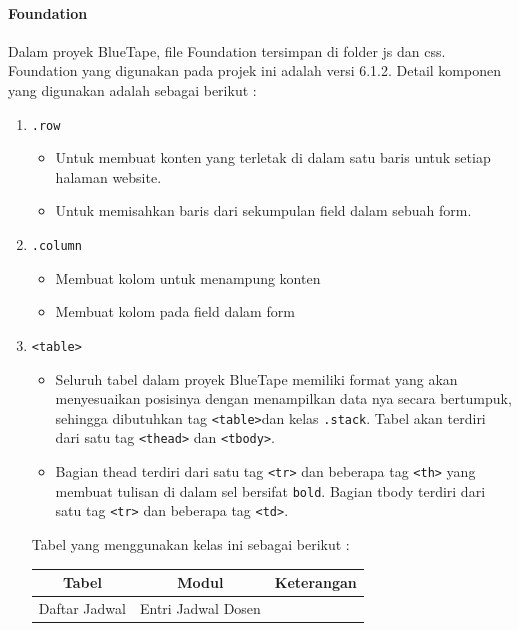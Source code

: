\documentclass[a4paper,twoside]{article}
\begin{document}
\begin{enumerate}
		\paragraph{Foundation}
		Dalam proyek BlueTape, file Foundation tersimpan di folder js dan css. Foundation yang digunakan pada projek ini adalah versi 6.1.2. Detail komponen yang digunakan adalah sebagai berikut :
		\begin{enumerate}
			\item \colorbox{mygray}{\texttt{.row}}
			\begin{itemize}
				\item Untuk membuat konten yang terletak di dalam satu baris untuk setiap halaman website.
				\item Untuk memisahkan baris dari sekumpulan field dalam sebuah form.
			\end{itemize}
			\item \colorbox{mygray}{\texttt{.column}}
			\begin{itemize}
				\item Membuat kolom untuk menampung konten
				\item Membuat kolom pada field dalam form
			\end{itemize}	
			\item \colorbox{mygray}{\texttt{<table>}}  \par
			\begin{itemize}
				\item 	Seluruh tabel dalam proyek BlueTape memiliki format yang akan menyesuaikan posisinya dengan menampilkan data nya secara bertumpuk, sehingga dibutuhkan tag \colorbox{mygray}{\texttt{<table>}}dan kelas \colorbox{mygray}{\texttt{.stack}}. Tabel akan terdiri dari satu tag \colorbox{mygray}{\texttt{<thead>}} dan \colorbox{mygray}{\texttt{<tbody>}}.
				\item Bagian thead terdiri dari satu tag \colorbox{mygray}{\texttt{<tr>}} dan beberapa tag \colorbox{mygray}{\texttt{<th>}} yang membuat tulisan di dalam sel bersifat \texttt{bold}. Bagian tbody terdiri dari satu tag \colorbox{mygray}{\texttt{<tr>}} dan beberapa tag \colorbox{mygray}{\texttt{<td>}}. 
			\end{itemize}
			Tabel yang menggunakan kelas ini sebagai berikut :
			\begin{center}
				\begin{tabular}{||c | c | c||} 
					\hline
					Tabel & Modul & Keterangan \\ [0.5ex] 
					\hline\hline
					Daftar Jadwal &  Entri Jadwal Dosen &\\

\end{tabular}
\end{center}
\end{enumerate}
\end{enumerate}
\end{document}
